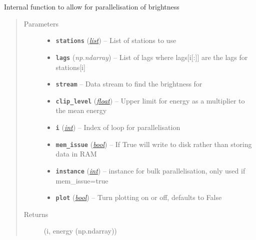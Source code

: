 \documentclass[a4paper,10pt,english]{sphinxmanual}
\begin{document}

\begin{fulllineitems}
\label{core:bright_lights._node_loop}
Internal function to allow for parallelisation of brightness
\begin{quote}\begin{description}
\item[{Parameters}] \leavevmode\begin{itemize}
\item {} 
\textbf{\texttt{stations}} (\href{https://docs.python.org/library/functions.html\#list}{\emph{list}}) -- List of stations to use

\item {} 
\textbf{\texttt{lags}} (\emph{np.ndarray}) -- List of lags where lags{[}i{[}:{]}{]} are the lags for stations{[}i{]}

\item {} 
\textbf{\texttt{stream}} -- Data stream to find the brightness for

\item {} 
\textbf{\texttt{clip\_level}} (\href{https://docs.python.org/library/functions.html\#float}{\emph{float}}) -- Upper limit for energy as a multiplier to the mean energy

\item {} 
\textbf{\texttt{i}} (\href{https://docs.python.org/library/functions.html\#int}{\emph{int}}) -- Index of loop for parallelisation

\item {} 
\textbf{\texttt{mem\_issue}} (\href{https://docs.python.org/library/functions.html\#bool}{\emph{bool}}) -- If True will write to disk rather than storing data in RAM

\item {} 
\textbf{\texttt{instance}} (\href{https://docs.python.org/library/functions.html\#int}{\emph{int}}) -- instance for bulk parallelisation, only used if mem\_issue=true

\item {} 
\textbf{\texttt{plot}} (\href{https://docs.python.org/library/functions.html\#bool}{\emph{bool}}) -- Turn plotting on or off, defaults to False

\end{itemize}

\item[{Returns}] \leavevmode
(i, energy (np.ndarray))

\end{description}\end{quote}

\end{fulllineitems}
\end{document}
